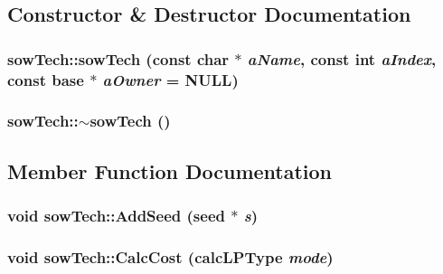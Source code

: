 \subsection{Constructor \& Destructor Documentation}
\hypertarget{classsow_tech_af2c05557103b1f521bf0eb9fa3c99184}{
\subsubsection[{sowTech}]{\setlength{\rightskip}{0pt plus 5cm}sowTech::sowTech (const char $\ast$ {\em aName}, \/  const int {\em aIndex}, \/  const {\bf base} $\ast$ {\em aOwner} = {\ttfamily NULL})}}
\label{classsow_tech_af2c05557103b1f521bf0eb9fa3c99184}
\hypertarget{classsow_tech_a166961c766601040ddbc7c0c7512898c}{
\subsubsection[{$\sim$sowTech}]{\setlength{\rightskip}{0pt plus 5cm}sowTech::$\sim$sowTech ()}}
\label{classsow_tech_a166961c766601040ddbc7c0c7512898c}


\subsection{Member Function Documentation}
\hypertarget{classsow_tech_a325472a41315e1397c1ca4926a5caf4f}{
\subsubsection[{AddSeed}]{\setlength{\rightskip}{0pt plus 5cm}void sowTech::AddSeed ({\bf seed} $\ast$ {\em s})}}
\label{classsow_tech_a325472a41315e1397c1ca4926a5caf4f}
\hypertarget{classsow_tech_a044008a71f40c31f0bd3469476c70e97}{
\subsubsection[{CalcCost}]{\setlength{\rightskip}{0pt plus 5cm}void sowTech::CalcCost ({\bf calcLPType} {\em mode})}}
\label{classsow_tech_a044008a71f40c31f0bd3469476c70e97}


